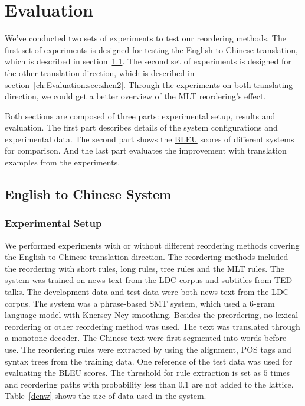 
\chapter{Evaluation}
\label{ch:Evaluation}

We've conducted two sets of experiments to test our reordering methods. The first set of experiments is designed for testing the English-to-Chinese translation, which is described in section~\ref{ch:Evaluation:sec:enw}. The second set of experiments is designed for the other translation direction, which is described in section~\ref{ch:Evaluation:sec:zhen2}. Through the experiments on both translating direction, we could get a better overview of the MLT reordering's effect.

Both sections are composed of three parts: experimental setup, results and evaluation. The first part describes details of the system configurations and experimental data. The second part shows the \hyperref[ch:Foundations:sec:bleu]{BLEU} scores of different systems for comparison. And the last part evaluates the improvement with translation examples from the experiments.


\section{English to Chinese System}
\label{ch:Evaluation:sec:enw}

\subsection{Experimental Setup}
We performed experiments with or without different reordering methods covering the English-to-Chinese translation direction. The reordering methods included the reordering with short rules, long rules, tree rules and the MLT rules. The system was trained on news text from the LDC corpus and subtitles from TED talks. The development data and test data were both news text from the LDC corpus. The system was a phrase-based SMT system, which used a $6$-gram language model with Knersey-Ney smoothing. Besides the preordering, no lexical reordering or other reordering method was used. The text was translated through a monotone decoder. The Chinese text were first segmented into words before use.
The reordering rules were extracted by using the alignment, POS tags and syntax trees from the training data. One reference of the test data was used for evaluating the BLEU scores. The threshold for rule extraction is set as $5$ times and reordering paths with probability less than $0.1$ are not added to the lattice. Table~\ref{denw} shows the size of data used in the system. %

